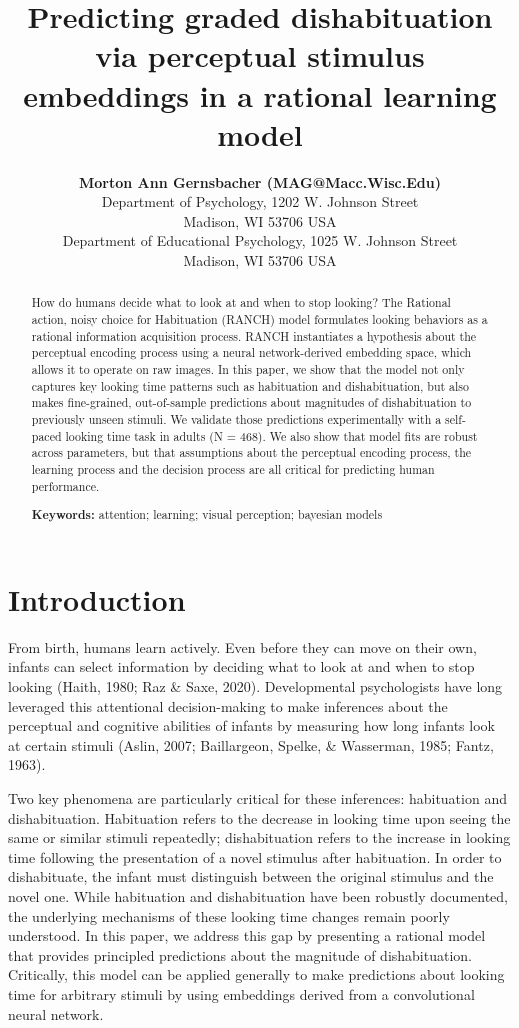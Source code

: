 \documentclass[10pt, letterpaper]{article}
\title{Predicting graded dishabituation via perceptual stimulus
embeddings in a rational learning model}
\author{{\large \bf Morton Ann Gernsbacher (MAG@Macc.Wisc.Edu)} \\ Department of Psychology, 1202 W. Johnson Street \\ Madison, WI 53706 USA \AND {\large \bf Sharon J.~Derry (SDJ@Macc.Wisc.Edu)} \\ Department of Educational Psychology, 1025 W. Johnson Street \\ Madison, WI 53706 USA}
\begin{document}
\maketitle

\begin{abstract}
How do humans decide what to look at and when to stop looking? The
Rational action, noisy choice for Habituation (RANCH) model formulates
looking behaviors as a rational information acquisition process. RANCH
instantiates a hypothesis about the perceptual encoding process using a
neural network-derived embedding space, which allows it to operate on
raw images. In this paper, we show that the model not only captures key
looking time patterns such as habituation and dishabituation, but also
makes fine-grained, out-of-sample predictions about magnitudes of
dishabituation to previously unseen stimuli. We validate those
predictions experimentally with a self-paced looking time task in adults
(N = 468). We also show that model fits are robust across parameters,
but that assumptions about the perceptual encoding process, the learning
process and the decision process are all critical for predicting human
performance.

\textbf{Keywords:}
attention; learning; visual perception; bayesian models
\end{abstract}

\hypertarget{introduction}{%
\section{Introduction}\label{introduction}}

From birth, humans learn actively. Even before they can move on their
own, infants can select information by deciding what to look at and when
to stop looking (Haith, 1980; Raz \& Saxe, 2020). Developmental
psychologists have long leveraged this attentional decision-making to
make inferences about the perceptual and cognitive abilities of infants
by measuring how long infants look at certain stimuli (Aslin, 2007;
Baillargeon, Spelke, \& Wasserman, 1985; Fantz, 1963).

Two key phenomena are particularly critical for these inferences:
habituation and dishabituation. Habituation refers to the decrease in
looking time upon seeing the same or similar stimuli repeatedly;
dishabituation refers to the increase in looking time following the
presentation of a novel stimulus after habituation. In order to
dishabituate, the infant must distinguish between the original stimulus
and the novel one. While habituation and dishabituation have been
robustly documented, the underlying mechanisms of these looking time
changes remain poorly understood. In this paper, we address this gap by
presenting a rational model that provides principled predictions about
the magnitude of dishabituation. Critically, this model can be applied
generally to make predictions about looking time for arbitrary stimuli
by using embeddings derived from a convolutional neural network.
\end{document}
